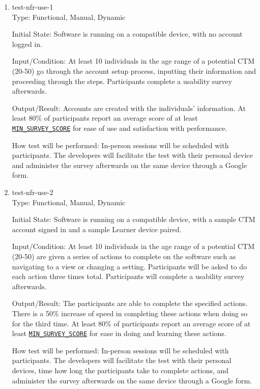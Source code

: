 \documentclass[12pt, titlepage]{article}
\newcommand{\paramref}[2]{\hyperlink{param:#1}{\texttt{#2}}}
\begin{document}
\begin{enumerate}

\item\label{test-nfr-use-1} test-nfr-use-1\\

Type: Functional, Manual, Dynamic
					
Initial State: Software is running on a compatible device, with no account logged in.
					
Input/Condition: At least 10 individuals in the age range of a potential CTM (20-50) go through the account setup process, inputting their information and proceeding through the steps. Participants complete a usability survey afterwards.
					
Output/Result: Accounts are created with the individuals' information. At least 80\% of participants report an average score of at least \paramref{min-survey-score}{MIN\_SURVEY\_SCORE} for ease of use and satisfaction with performance.
					
How test will be performed: In-person sessions will be scheduled with participants. The developers will facilitate the test with their personal device and administer the survey afterwards on the same device through a Google form.

\item\label{test-nfr-use-2} test-nfr-use-2\\

Type: Functional, Manual, Dynamic
					
Initial State: Software is running on a compatible device, with a sample CTM account signed in and a sample Learner device paired.
					
Input/Condition: At least 10 individuals in the age range of a potential CTM (20-50) are given a series of actions to complete on the software such as navigating to a view or changing a setting. Participants will be asked to do each action three times total. Participants will complete a usability survey afterwards.
					
Output/Result: The participants are able to complete the specified actions. There is a 50\% increase of speed in completing these actions when doing so for the third time. At least 80\% of participants report an average score of at least \paramref{min-survey-score}{MIN\_SURVEY\_SCORE} for ease in doing and learning these actions.
					
How test will be performed: In-person sessions will be scheduled with participants. The developers will facilitate the test with their personal devices, time how long the participants take to complete actions, and administer the survey afterwards on the same device through a Google form.


\end{enumerate}
\end{document}
